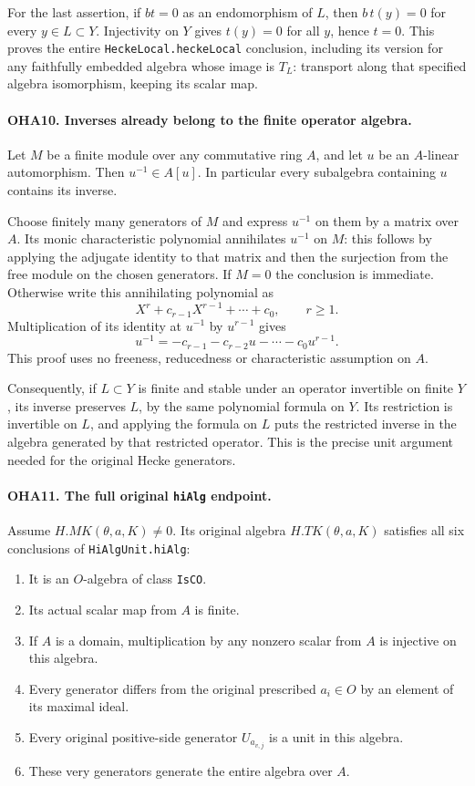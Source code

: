 For the last assertion, if \(bt=0\) as an endomorphism of \(L\),
then \(b\,t(y)=0\) for every \(y\in L\subset Y\).
Injectivity on \(Y\) gives \(t(y)=0\) for all \(y\), hence \(t=0\).
This proves the entire \texttt{HeckeLocal.heckeLocal} conclusion,
including its version for any faithfully embedded algebra whose
image is \(T_L\): transport along that specified algebra
isomorphism, keeping its scalar map.

\paragraph{OHA10. Inverses already belong to the finite operator algebra.}
\label{claim:OHA10}
Let \(M\) be a finite module over any commutative ring \(A\),
and let \(u\) be an \(A\)-linear automorphism. Then
\(u^{-1}\in A[u]\). In particular every subalgebra containing
\(u\) contains its inverse.

Choose finitely many generators of \(M\) and express \(u^{-1}\)
on them by a matrix over \(A\). Its monic characteristic
polynomial annihilates \(u^{-1}\) on \(M\): this follows by
applying the adjugate identity to that matrix and then the
surjection from the free module on the chosen generators.
If \(M=0\) the conclusion is immediate. Otherwise write this
annihilating polynomial as
\[
                    X^r+c_{r-1}X^{r-1}+\cdots+c_0,\qquad r\ge1 .
\]
Multiplication of its identity at \(u^{-1}\) by \(u^{r-1}\)
gives
\[
            u^{-1}=-c_{r-1}-c_{r-2}u-\cdots-c_0u^{r-1}.
\]
This proof uses no freeness, reducedness or characteristic
assumption on \(A\).

Consequently, if \(L\subset Y\) is finite and stable under
an operator invertible on finite \(Y\), its inverse preserves
\(L\), by the same polynomial formula on \(Y\).
Its restriction is invertible on \(L\), and applying the formula
on \(L\) puts the restricted inverse in the algebra generated
by that restricted operator. This is the precise unit argument
needed for the original Hecke generators.

\paragraph{OHA11. The full original \texttt{hiAlg} endpoint.}
\label{claim:OHA11}
Assume \(H.MK(\theta,a,K)\ne0\). Its original algebra
\(H.TK(\theta,a,K)\) satisfies all six conclusions of
\texttt{HiAlgUnit.hiAlg}:
\begin{enumerate}
\item It is an \(O\)-algebra of class \texttt{IsCO}.
\item Its actual scalar map from \(A\) is finite.
\item If \(A\) is a domain, multiplication by any nonzero
  scalar from \(A\) is injective on this algebra.
\item Every generator differs from the original prescribed
  \(a_i\in O\) by an element of its maximal ideal.
\item Every original positive-side generator \(U_{a_{v,j}}\)
  is a unit in this algebra.
\item These very generators generate the entire algebra over \(A\).
\end{enumerate}

